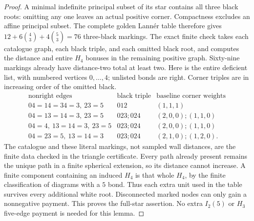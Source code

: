 \documentclass[11pt]{article}
\begin{document}
\begin{proof}
A minimal indefinite principal subset of its star contains all three
black roots: omitting any one leaves an actual positive corner.
Compactness excludes an affine principal subset. The complete golden
Lann\'er table therefore gives
$12+6\binom43+4\binom53=76$ three-black markings.
The exact finite check takes each catalogue graph, each black triple,
and each omitted black root, and computes the distance and entire
$H_4$ bonuses in the remaining positive graph. Sixty-nine markings
already have distance-two total at least two. Here is the entire
deficient list, with numbered vertices $0,\ldots,4$; unlisted bonds
are right. Corner triples are in increasing order of the omitted black.
\[
\begin{array}{c|c|c}
\text{nonright edges}&\text{black triple}&\text{baseline corner weights}\\ \hline
04=14=34=3,\ 23=5&012&(1,1,1)\\
04=13=14=3,\ 23=5&023;024&(2,0,0);(1,1,0)\\
04=4,\ 13=14=3,\ 23=5&023;024&(2,0,0);(1,1,0)\\
04=23=5,\ 13=14=3&023;024&(2,1,0);(1,2,0).
\end{array}
\]
The catalogue and these literal markings, not sampled wall distances,
are the finite data checked in the triangle certificate.
Every path already present remains the unique path in a finite
spherical extension, so its distance cannot increase. A finite
component containing an induced $H_4$ is that whole $H_4$, by the
finite classification of diagrams with a $5$ bond. Thus each extra
unit used in the table survives every additional white root.
Disconnected marked nodes can only gain a nonnegative payment.
This proves the full-star assertion. No extra $I_2(5)$ or $H_3$
five-edge payment is needed for this lemma.
\end{proof}
\end{document}
